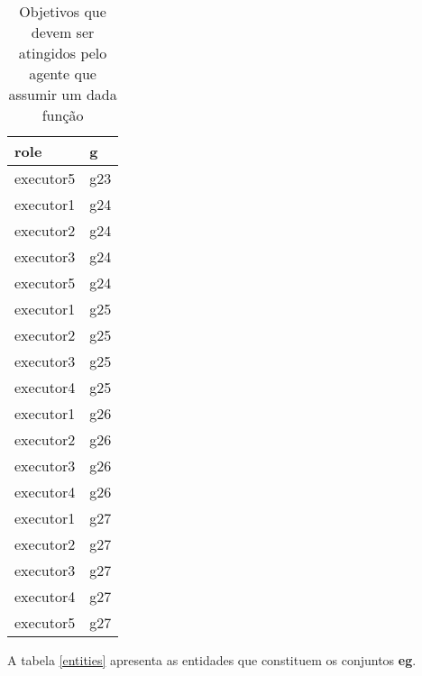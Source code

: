 \begin{table}[H]
\centering
{}
\begin{tabular}{|l|l|}
\hline
\textbf{role} & \textbf{g} \\ \hline
executor5 & g23 \\ \hline
executor1 & g24 \\ \hline
executor2 & g24 \\ \hline
executor3 & g24 \\ \hline
executor5 & g24 \\ \hline
executor1 & g25 \\ \hline
executor2 & g25 \\ \hline
executor3 & g25 \\ \hline
executor4 & g25 \\ \hline
executor1 & g26 \\ \hline
executor2 & g26 \\ \hline
executor3 & g26 \\ \hline
executor4 & g26 \\ \hline
executor1 & g27 \\ \hline
executor2 & g27 \\ \hline
executor3 & g27 \\ \hline
executor4 & g27 \\ \hline
executor5 & g27 \\ \hline
\end{tabular}
\caption{Objetivos que devem ser atingidos pelo agente que assumir um dada função}
\label{deontic4}
\end{table}

A tabela \ref{entities} apresenta as entidades que constituem os conjuntos \textbf{eg}.

